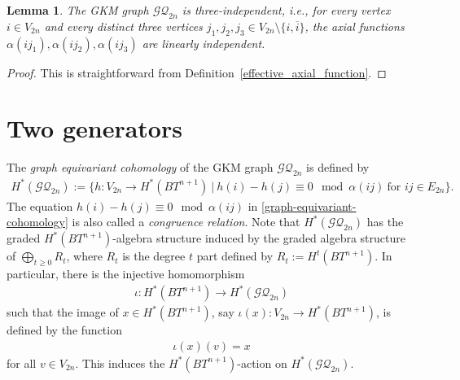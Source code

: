 \documentclass[12pt]{amsart}
\newtheorem{lemma}[theorem]{Lemma}
\theoremstyle{remark}
\numberwithin{equation}{section}
\begin{document}
\begin{lemma}
\label{three-independent}
The GKM graph $\mathcal{GQ}_{2n}$ is three-independent, i.e., for every vertex $i\in V_{2n}$ and every distinct three vertices $j_{1}, j_{2}, j_{3}\in V_{2n}\setminus \{i, \overline{i}\}$, the axial functions $\alpha(i j_{1}), \alpha(i j_{2}), \alpha(i j_{3})$ are linearly independent. 
\end{lemma}
\begin{proof}
This is straightforward from Definition~\ref{effective_axial_function}.
\end{proof}


\section{Two generators}
\label{sect:3}

The {\it graph equivariant cohomology} of the GKM graph $\mathcal{GQ}_{2n}$ is defined by 
\begin{align}
\label{graph-equivariant-cohomology}
H^{*}(\mathcal{GQ}_{2n}):=\{h:V_{2n}\to H^{*}(BT^{n+1})\ |\ h(i)-h(j)\equiv 0 \mod \alpha(ij)\ \text{for $ij\in E_{2n}$}\}.
\end{align}
The equation $h(i)-h(j)\equiv 0 \mod \alpha(ij)$ in \eqref{graph-equivariant-cohomology} is also called a {\it congruence relation}.
Note that $H^{*}(\mathcal{GQ}_{2n})$ has the graded $H^{*}(BT^{n+1})$-algebra structure induced by the graded algebra structure of $\bigoplus_{t\ge 0}R_{t}$, where $R_{t}$ is the degree $t$ part defined by $R_{t}:=H^{t}(BT^{n+1})$.
In particular, 
there is the injective homomorphism 
\begin{align}
\label{algebra-structure}
\iota:H^{*}(BT^{n+1}) \to H^{*}(\mathcal{GQ}_{2n})
\end{align}
such that the image of $x\in H^{*}(BT^{n+1})$, say $\iota(x):V_{2n}\to H^{*}(BT^{n+1})$,  is defined by the function 
\begin{align*}
\iota(x)(v)=x
\end{align*}
for all $v\in V_{2n}$.
This induces the $H^{*}(BT^{n+1})$-action on $H^{*}(\mathcal{GQ}_{2n})$.
\end{document}
